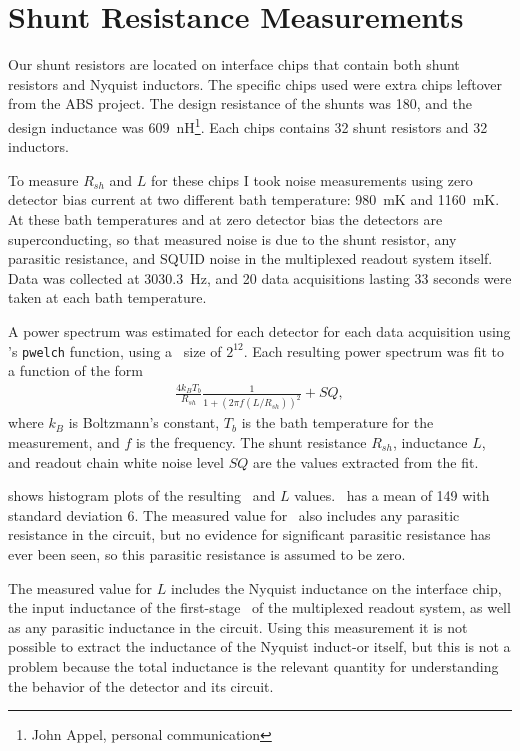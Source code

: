 
\section{Shunt Resistance Measurements}\label{sec:shunt-nyquist}

Our shunt resistors are located on interface chips that contain both shunt resistors and Nyquist inductors.
The specific chips used were extra chips leftover from the ABS\cite{kusaka_modulation_2013} project.
The design resistance of the shunts was \SI{180}{\uohm}, and the design inductance was 609~nH\footnote{John Appel, personal communication}.
Each chips contains 32 shunt resistors and 32 inductors.

To measure $R_{sh}$ and $L$ for these chips I took noise measurements using zero detector bias current at two different bath temperature: 980~mK and 1160~mK.
At these bath temperatures and at zero detector bias the detectors are superconducting, so that measured noise is due to the shunt resistor, any parasitic resistance, and SQUID noise in the multiplexed readout system itself.
Data was collected at 3030.3~Hz, and 20 data acquisitions lasting 33 seconds were taken at each bath temperature.

A power spectrum was estimated for each detector for each data acquisition using \MATLAB's \texttt{pwelch} function, using a \FFT\ size of $2^{12}$.
Each resulting power spectrum was fit to a function of the form
\begin{eqnarray}\label{eqn:scnoise-fit}
	\frac{4 k_B T_b}{R_{sh}} \frac{1}{1 + (2 \pi f (L/R_{sh}))^2} + SQ,
\end{eqnarray}
where $k_B$ is Boltzmann's constant, $T_b$ is the bath temperature for the measurement, and $f$ is the frequency.
The shunt resistance $R_{sh}$, inductance $L$, and readout chain white noise level $SQ$ are the values extracted from the fit.

 shows histogram plots of the resulting \Rsh\ and $L$ values.
\Rsh\ has a mean of \SI{149}{\uohm} with standard deviation \SI{6}{\uohm}.
The measured value for \Rsh\ also includes any parasitic resistance in the circuit, but no evidence for significant parasitic resistance has ever been seen, so this parasitic resistance is assumed to be zero.

The measured value for $L$ includes the Nyquist inductance on the interface chip, the input inductance of the first-stage \SQUID\ of the multiplexed readout system, as well as any parasitic inductance in the circuit.
Using this measurement it is not possible to extract the inductance of the Nyquist induct-or itself, but this is not a problem because the total inductance is the relevant  quantity for understanding the behavior of the detector and its circuit.

